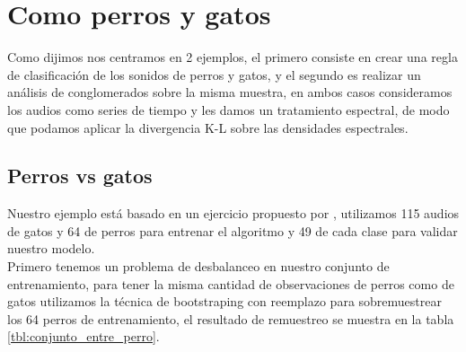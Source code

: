 \documentclass[twocolumn,10pt]{asme2ej}
\begin{document}

\section*{Como perros y gatos} %
\label{sec:como_perros_y_gatos}
Como dijimos nos centramos en 2 ejemplos, el primero consiste en crear una regla de clasificaci\'on de los sonidos de perros y gatos, y el segundo es realizar un an\'alisis de conglomerados sobre la misma muestra, en ambos casos consideramos los audios como series de tiempo y les damos un tratamiento espectral, de modo que podamos aplicar la divergencia K-L sobre las densidades espectrales.
\subsection*{Perros vs gatos} %
\label{sub:perros_vs_gatos}
Nuestro ejemplo est\'a basado en un ejercicio propuesto por \cite{DATOS2}, utilizamos 115 audios de gatos y 64 de perros para entrenar el algoritmo y 49 de cada clase para validar nuestro modelo.\\

Primero tenemos un problema de desbalanceo en nuestro conjunto de entrenamiento, para tener la misma cantidad de observaciones de perros como de gatos utilizamos la t\'ecnica de bootstraping con reemplazo para sobremuestrear los 64 perros de entrenamiento, el resultado de remuestreo se muestra en la tabla \ref{tbl:conjunto_entre_perro}.\\
\end{document}
